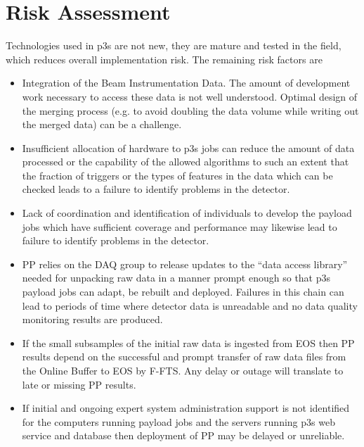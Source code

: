 \documentclass[pdftex,12pt,letter]{article}
\begin{document}
\section{Risk Assessment}
\label{sec:risk}

Technologies used in p3s are not new, they are mature and tested in the field, which reduces
overall implementation risk. The remaining risk factors are
\begin{itemize}

\item Integration of the Beam Instrumentation Data. The amount
of development work necessary to access these data is not well
understood. Optimal design of the merging process (e.g. to avoid
doubling the data volume while writing out the merged data)
can be a challenge.

\item Insufficient allocation of hardware to p3s jobs can reduce
  the amount of data processed or the capability of the allowed
  algorithms to such an extent that the fraction of triggers or the
  types of features in the data which can be checked leads to a
  failure to identify problems in the detector.

\item Lack of coordination and identification of individuals to
  develop the payload jobs which have sufficient coverage and
  performance may likewise lead to failure to identify problems in the
  detector.


\item PP relies on the DAQ group to release updates to the ``data
  access library'' needed for unpacking raw data in a manner prompt
  enough so that p3s payload jobs can adapt, be rebuilt and deployed.
  Failures in this chain can lead to periods of time where detector
  data is unreadable and no data quality monitoring results are
  produced.

\item If the small subsamples of the initial raw data is ingested from
  EOS then PP results depend on the successful and prompt transfer of
  raw data files from the Online Buffer to EOS by F-FTS.  Any delay or
  outage will translate to late or missing PP results.

\item If initial and ongoing expert system administration support is
  not identified for the computers running payload jobs and the
  servers running p3s web service and database then deployment of PP
  may be delayed or unreliable.

\end{itemize}
\end{document}
